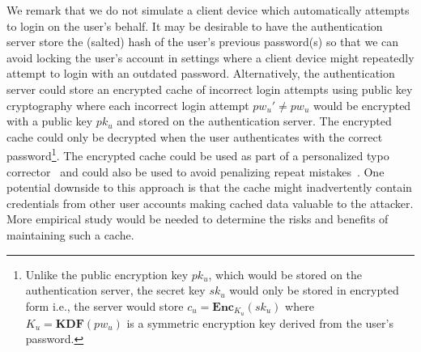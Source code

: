 We remark that we do not simulate a client device which automatically attempts to login on the user's behalf. It may be desirable to have the authentication server store the (salted) hash of the user's previous password(s) so that we can avoid locking the user's account in settings where a client device might repeatedly attempt to login with an outdated password. Alternatively, the authentication server could store an encrypted cache of incorrect login attempts using public key cryptography where each incorrect login attempt $pw_u' \neq pw_u$ would be encrypted with a public key $pk_u$ and stored on the authentication server. The encrypted cache could only be decrypted when the user authenticates with the correct password\footnote{Unlike the public encryption key $pk_u$, which would be stored on the authentication server, the secret key $sk_u$ would only be stored in encrypted form i.e., the server would store $c_u = \mathbf{Enc}_{K_u}(sk_u)$ where $K_u = \mathbf{KDF}(pw_u)$ is a symmetric encryption key derived from the user's password. }. The encrypted cache could be used as part of a personalized typo corrector~\cite{CCS:CWPCR17} and could also be used to avoid penalizing repeat mistakes~\cite{CCS:CWPCR17,EuroSP:THS19}. One potential downside to this approach is that the cache might inadvertently contain credentials from other user accounts making cached data valuable to the attacker. More empirical study would be needed to determine the risks and benefits of maintaining such a cache. 




